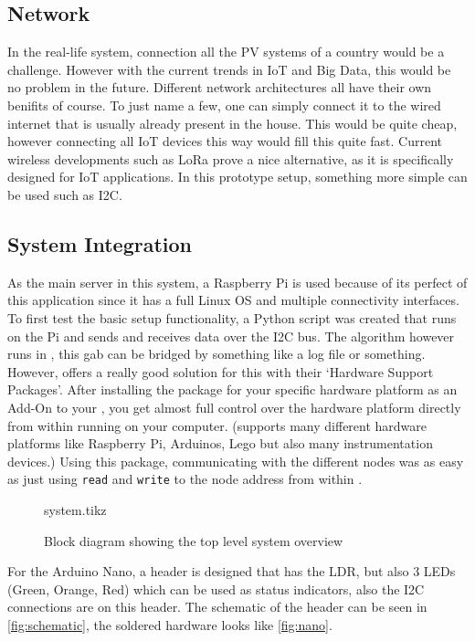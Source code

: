 \documentclass[a4paper,journal]{DDREAM}
\begin{document}
\subsection{Network}
In the real-life system, connection all the PV systems of a country would be a challenge.
However with the current trends in IoT and Big Data, this would be no problem in the future.
Different network architectures all have their own benifits of course.
To just name a few, one can simply connect it to the wired internet that is usually already present in the house.
This would be quite cheap, however connecting all IoT devices this way would fill this quite fast.
Current wireless developments such as LoRa prove a nice alternative, as it is specifically designed for IoT applications.
In this prototype setup, something more simple can be used such as I2C.

\subsection{System Integration}
As the main server in this system, a Raspberry Pi is used because of its perfect of this application since it has a full Linux OS and multiple connectivity interfaces.
To first test the basic setup functionality, a Python script was created that runs on the Pi and sends and receives data over the I2C bus.
The algorithm however runs in \matlab, this gab can be bridged by something like a log file or something.
However, \matlab offers a really good solution for this with their `Hardware Support Packages'.
After installing the package for your specific hardware platform as an Add-On to your \matlab, you get almost full control over the hardware platform directly from within \matlab running on your computer.
(\matlab supports many different hardware platforms like Raspberry Pi, Arduinos, Lego but also many instrumentation devices.)
Using this package, communicating with the different nodes was as easy as just using \texttt{read} and \texttt{write} to the node address from within \matlab.


\begin{figure}[H]
\centering
    {system.tikz}
    \caption{Block diagram showing the top level system overview}
    \label{fig:system}
\end{figure}

For the Arduino Nano, a header is designed that has the LDR, but also 3 LEDs (Green, Orange, Red) which can be used as status indicators, also the I2C connections are on this header.
The schematic of the header can be seen in \autoref{fig:schematic}, the soldered hardware looks like \autoref{fig:nano}.
\end{document}
